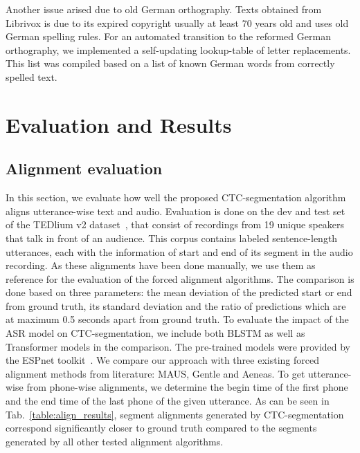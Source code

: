 \documentclass[runningheads]{llncs}
\begin{document}
Another issue arised due to old German orthography.
Texts obtained from Librivox is due to its expired copyright usually at least 70 years old and uses old German spelling rules.
For an automated transition to the reformed German orthography,
we implemented a self-updating lookup-table of letter replacements.
This list was compiled based on a list of known German words from correctly spelled text.


\section{Evaluation and Results}

\subsection{Alignment evaluation}

In this section, we evaluate how well the proposed CTC-segmentation algorithm aligns utterance-wise text and audio.
Evaluation is done on the dev and test set of the TEDlium v2 dataset~\cite{Rousseau2014}, that consist of recordings from 19 unique speakers that talk in front of an audience.
This corpus contains labeled sentence-length utterances, each with the information of start and end of its segment in the audio recording.
As these alignments have been done manually, we use them as reference for the evaluation of the forced alignment algorithms.
The comparison is done based on three parameters:
the mean deviation of the predicted start or end from ground truth, its standard deviation and the ratio of predictions which are at maximum 0.5 seconds apart from ground truth.
To evaluate the impact of the ASR model on CTC-segmentation, we include both BLSTM as well as Transformer models in the comparison.
The pre-trained models were provided by the ESPnet toolkit~\cite{Watanabe2018}.
We compare our approach with three existing forced alignment methods from literature: MAUS, Gentle and Aeneas.
To get utterance-wise from phone-wise alignments, we determine the begin time of the first phone and the end time of the last phone of the given utterance.
As can be seen in Tab.~\ref{table:align_results}, segment alignments generated by CTC-segmentation correspond significantly closer to ground truth compared to the segments generated by all other tested alignment algorithms.
\end{document}
